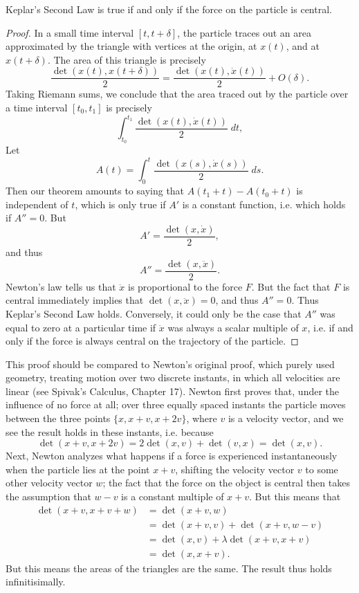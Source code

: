 \begin{theorem}
    Keplar's Second Law is true if and only if the force on the particle is central.
\end{theorem}
\begin{proof}
    In a small time interval $[t, t + \delta]$, the particle traces out an area approximated by the triangle with vertices at the origin, at $x(t)$, and at $x(t + \delta)$. The area of this triangle is precisely
    \[ \frac{\det(x(t), x(t + \delta))}{2} = \frac{\det(x(t), \dot{x}(t))}{2} + O(\delta). \]
    Taking Riemann sums, we conclude that the area traced out by the particle over a time interval $[t_0, t_1]$ is precisely
    \[ \int_{t_0}^{t_1} \frac{\det(x(t), \dot{x}(t))}{2}\; dt, \]
    Let
    \[ A(t) = \int_0^t \frac{\det(x(s), \dot{x}(s))}{2}\; ds. \]
    Then our theorem amounts to saying that $A(t_1 + t) - A(t_0 + t)$ is independent of $t$, which is only true if $A'$ is a constant function, i.e. which holds if $A'' = 0$. But
    \[ A' = \frac{\det(x, \dot{x})}{2}, \]
    and thus
    \[ A'' = \frac{\det(x, \ddot{x})}{2}. \]
    Newton's law tells us that $\ddot{x}$ is proportional to the force $F$. But the fact that $F$ is central immediately implies that $\det(x, \ddot{x}) = 0$, and thus $A'' = 0$. Thus Keplar's Second Law holds. Conversely, it could only be the case that $A''$ was equal to zero at a particular time if $\ddot{x}$ was always a scalar multiple of $x$, i.e. if and only if the force is always central on the trajectory of the particle.
\end{proof}

\begin{remark}
    This proof should be compared to Newton's original proof, which purely used geometry, treating motion over two discrete instants, in which all velocities are linear (see Spivak's Calculus, Chapter 17). Newton first proves that, under the influence of no force at all; over three equally spaced instants the particle moves between the three points $\{ x, x + v, x + 2v \}$, where $v$ is a velocity vector, and we see the result holds in these instants, i.e. because
    \[ \det( x + v, x + 2v ) = 2 \det( x, v ) + \det( v, x ) = \det( x, v ). \]
    Next, Newton analyzes what happens if a force is experienced instantaneously when the particle lies at the point $x + v$, shifting the velocity vector $v$ to some other velocity vector $w$; the fact that the force on the object is central then takes the assumption that $w - v$ is a constant multiple of $x + v$. But this means that
    \begin{align*}
        \det(x + v, x + v + w) &= \det( x + v, w )\\
        &= \det( x + v, v) + \det( x + v, w - v )\\
        &= \det( x, v) + \lambda \det( x + v, x + v )\\
        &= \det( x, x + v ).
    \end{align*}
    But this means the areas of the triangles are the same. The result thus holds infinitisimally.
\end{remark}

